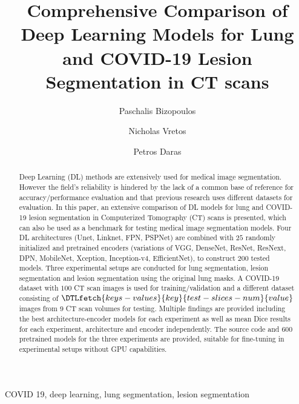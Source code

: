 \documentclass{elsarticle}
\providecommand{\FILEPATH}{.}
\begin{document}
\DTLloaddb{keys-values}{\FILEPATH/keys-values.csv}

\title{Comprehensive Comparison of Deep Learning Models for Lung and COVID-19 Lesion Segmentation in CT scans}
\author[1]{Paschalis Bizopoulos}
\author[1]{Nicholas Vretos}
\author[1]{Petros Daras}

\address[1]{Visual Computing Lab of the Information Technologies Institute, Centre for Research and Technology Hellas, Thessaloniki, Greece e-mail: pbizop@gmail.com,\{vretos,daras\}@iti.gr}

\begin{abstract}
  Deep Learning (DL) methods are extensively used for medical image segmentation.
  However the field's reliability is hindered by the lack of a common base of reference for accuracy/performance evaluation and that previous research uses different datasets for evaluation.
  In this paper, an extensive comparison of DL models for lung and COVID-19 lesion segmentation in Computerized Tomography (CT) scans is presented, which can also be used as a benchmark for testing medical image segmentation models.
  Four DL architectures (Unet, Linknet, FPN, PSPNet) are combined with $25$ randomly initialized and pretrained encoders (variations of VGG, DenseNet, ResNet, ResNext, DPN, MobileNet, Xception, Inception-v4, EfficientNet), to construct $200$ tested models.
  Three experimental setups are conducted for lung segmentation, lesion segmentation and lesion segmentation using the original lung masks.
  A COVID-19 dataset with $100$ CT scan images is used for training/validation and a different dataset consisting of $\DTLfetch{keys-values}{key}{test-slices-num}{value}$ images from $9$ CT scan volumes for testing.
  Multiple findings are provided including the best architecture-encoder models for each experiment as well as mean Dice results for each experiment, architecture and encoder independently.
  The source code and $600$ pretrained models for the three experiments are provided, suitable for fine-tuning in experimental setups without GPU capabilities.
\end{abstract}

\begin{keyword}
  COVID 19, deep learning, lung segmentation, lesion segmentation
\end{keyword}

\maketitle
\end{document}
